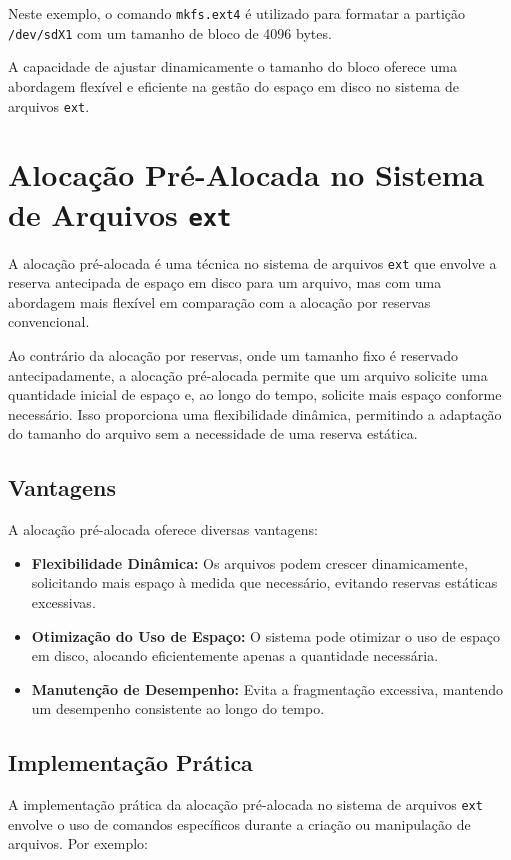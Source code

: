 \documentclass[
	12pt,				%
	openright,			%
	oneside,			%
	a4paper,			%
	chapter=TITLE,		%
	english,			%
	french,				%
	spanish,			%
	brazil				%
	]{abntex2}
\theoremstyle{definition}
\begin{document}
Neste exemplo, o comando \texttt{mkfs.ext4} é utilizado para formatar a partição \texttt{/dev/sdX1} com um tamanho de bloco de 4096 bytes.

A capacidade de ajustar dinamicamente o tamanho do bloco oferece uma abordagem flexível e eficiente na gestão do espaço em disco no sistema de arquivos \texttt{ext}.

\section{Alocação Pré-Alocada no Sistema de Arquivos \texttt{ext}}
A alocação pré-alocada é uma técnica no sistema de arquivos \texttt{ext} que envolve a reserva antecipada de espaço em disco para um arquivo, mas com uma abordagem mais flexível em comparação com a alocação por reservas convencional.

Ao contrário da alocação por reservas, onde um tamanho fixo é reservado antecipadamente, a alocação pré-alocada permite que um arquivo solicite uma quantidade inicial de espaço e, ao longo do tempo, solicite mais espaço conforme necessário. Isso proporciona uma flexibilidade dinâmica, permitindo a adaptação do tamanho do arquivo sem a necessidade de uma reserva estática.

\subsection{Vantagens}
A alocação pré-alocada oferece diversas vantagens:

\begin{itemize}
    \item \textbf{Flexibilidade Dinâmica:} Os arquivos podem crescer dinamicamente, solicitando mais espaço à medida que necessário, evitando reservas estáticas excessivas.
    
    \item \textbf{Otimização do Uso de Espaço:} O sistema pode otimizar o uso de espaço em disco, alocando eficientemente apenas a quantidade necessária.
    
    \item \textbf{Manutenção de Desempenho:} Evita a fragmentação excessiva, mantendo um desempenho consistente ao longo do tempo.
\end{itemize}

\subsection{Implementação Prática}
A implementação prática da alocação pré-alocada no sistema de arquivos \texttt{ext} envolve o uso de comandos específicos durante a criação ou manipulação de arquivos. Por exemplo:
\end{document}
